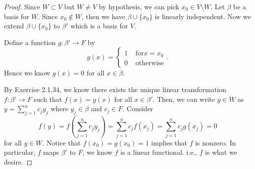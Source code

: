 \begin{Exercise}
\begin{proof}
Since $W\subset V$ but $W\neq V$ by hypothesis, we can pick $x_0\in V\setminus W$. Let $\beta$ be a basis for $W$. Since $x_0\notin W$, then we have $\beta\cup \{x_0\}$ is linearly independent. Now we extend $\beta\cup \{x_0\}$ to $\beta'$ which is a basis for $V$.

Define a function $g:\beta'\to F$ by 
$$
g(x)=\begin{cases}
1 & \mbox{ for} x=x_0 \\
0 & \mbox{ otherwise}
\end{cases}.
$$
Hence we know $g(x)=0$ for all $x\in \beta$.

By Exercise 2.1.34, we know there exists the unique linear transformation $f:\beta'\to F$ such that $f(x)=g(x)$ for all $x\in \beta'$. Then, we can write $y\in W$ as $y=\sum_{j=1}^{n} c_j y_j$ where $y_j\in \beta$ and $c_j\in F$. Consider
$$
f(y) = f(\sum_{j=1}^{n} c_j y_j) 
= \sum_{j=1}^{n} c_j f(x_j)
= \sum_{j=1}^{n} c_j g(x_j)
= 0
$$
for all $y\in W$.
Notice that $f(x_0) = g(x_0) = 1$ implies that $f$ is nonzero. In particular, $f$ maps $\beta'$ to $F$, we know $f$ is a linear functional. i.e., $f$ is what we desire.
\end{proof}
\end{Exercise}